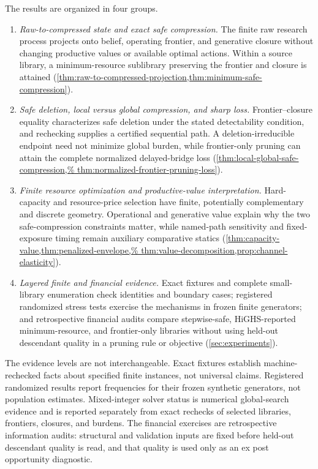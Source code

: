 The results are organized in four groups.
\begin{enumerate}
\item \emph{Raw-to-compressed state and exact safe compression.}
The finite raw research process projects onto belief, operating frontier, and
generative closure without changing productive values or available optimal
actions. Within a source library, a minimum-resource sublibrary preserving the
frontier and closure is attained
(\cref{thm:raw-to-compressed-projection,thm:minimum-safe-compression}).

\item \emph{Safe deletion, local versus global compression, and sharp loss.}
Frontier--closure equality characterizes safe deletion under the stated
detectability condition, and rechecking supplies a certified sequential path.
A deletion-irreducible endpoint need not minimize global burden, while
frontier-only pruning can attain the complete normalized delayed-bridge loss
(\cref{thm:local-global-safe-compression,%
thm:normalized-frontier-pruning-loss}).

\item \emph{Finite resource optimization and productive-value interpretation.}
Hard-capacity and resource-price selection have finite, potentially
complementary and discrete geometry. Operational and generative value explain
why the two safe-compression constraints matter, while named-path sensitivity
and fixed-exposure timing remain auxiliary comparative statics
(\cref{thm:capacity-value,thm:penalized-envelope,%
thm:value-decomposition,prop:channel-elasticity}).

\item \emph{Layered finite and financial evidence.}
Exact fixtures and complete small-library enumeration check identities and
boundary cases; registered randomized stress tests exercise the mechanisms in
frozen finite generators; and retrospective financial audits compare
stepwise-safe, HiGHS-reported minimum-resource, and frontier-only libraries
without
using held-out descendant quality in a pruning rule or objective
(\cref{sec:experiments}).
\end{enumerate}

The evidence levels are not interchangeable. Exact fixtures establish
machine-rechecked facts about specified finite instances, not universal
claims. Registered randomized results report frequencies for their frozen
synthetic generators, not population estimates. Mixed-integer solver status
is numerical global-search evidence and is reported separately from exact
rechecks of selected libraries, frontiers, closures, and burdens. The
financial exercises are retrospective information audits: structural and
validation inputs are fixed before held-out descendant quality is read, and
that quality is used only as an ex post opportunity diagnostic.

